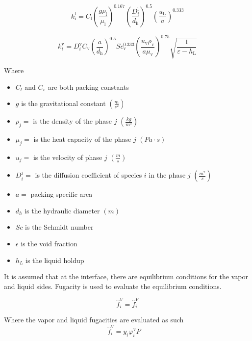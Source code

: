 \begin{equation}
k_i^{\mathrm{l}}=C_{\mathrm{l}}\left(\frac{g \rho_{\mathrm{l}}}{\mu_{\mathrm{l}}}\right)^{0.167}\left(\frac{D_i^{\mathrm{l}}}{d_{\mathrm{h}}}\right)^{0.5}\left(\frac{u_{\mathrm{L}}}{a}\right)^{0.333}
\end{equation}

\begin{equation}
k_i^{\mathrm{v}}=D_i^{\mathrm{v}} C_{\mathrm{v}}\left(\frac{a}{d_{\mathrm{h}}}\right)^{0.5} S c_{\mathrm{v}}^{0.333}\left(\frac{u_{\mathrm{v}} \rho_{\mathrm{v}}}{a \mu_{\mathrm{v}}}\right)^{0.75} \sqrt{\frac{1}{\varepsilon-h_{\mathrm{L}}}}
\end{equation}

Where

\begin{itemize}
  \item $C_l$ and $C_v$ are both packing constants
  \item $g$ is the gravitational constant $(\frac{m}{s^2})$
  \item $\rho _j=$ is the density of the phase $j$ $(\frac{kg}{m^3})$
  \item $\mu _j=$ is the heat capacity of the phase $j$ $(Pa\cdot s)$
  \item $u_j=$ is the velocity of phase $j$ $(\frac{m}{s})$
  \item $D_i^j=$ is the diffusion coefficient of species $i$ in the phase $j$ $(\frac{m^2}{s})$
  \item $a=$ packing specific area
  \item $d_h$ is the hydraulic diameter $(m)$
  \item $Sc$ is the Schmidt number
  \item $\epsilon$ is the void fraction
  \item $h_L$ is the liquid holdup
\end{itemize}

It is assumed that at the interface, there are equilibrium conditions for the vapor and liquid sides. Fugacity is used to evaluate the equilibrium conditions.

\begin{equation}
  \hat{f}_i^V=\hat{f}_i^V
\end{equation}

Where the vapor and liquid fugacities are evaluated as such
\begin{equation}
\hat{f}_i^V=y_i \varphi_i^V P \quad
\end{equation}

